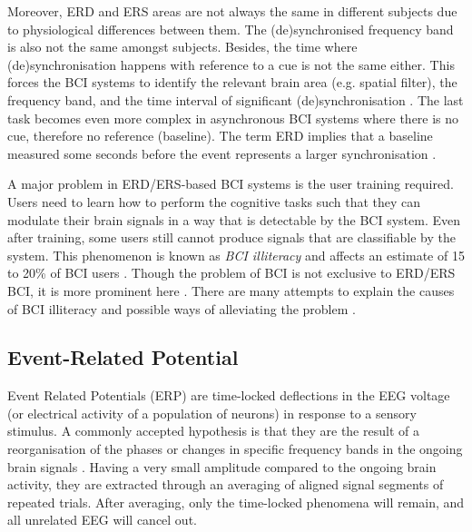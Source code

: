 Moreover, ERD and ERS areas are not always the same in different subjects due to physiological differences between them. 
The (de)synchronised frequency band is also not the same amongst subjects. 
Besides, the time where (de)synchronisation happens with reference to a cue is not the same either. 
This forces the BCI systems to identify the relevant brain area (e.g. spatial filter), the frequency band, and the time interval of significant (de)synchronisation \citep{yang_time_2014}. 
The last task becomes even more complex in asynchronous BCI systems where there is no cue, therefore no reference (baseline). 
The term ERD implies that a baseline measured some seconds before the event represents a larger synchronisation \citep{pfurtscheller_event-related_1999}.

A major problem in ERD/ERS-based BCI systems is the user training required. 
Users need to learn how to perform the cognitive tasks such that they can modulate their brain signals in a way that is detectable by the BCI system. 
Even after training, some users still cannot produce signals that are classifiable by the system. This phenomenon is known as \emph{BCI illiteracy} and affects an estimate of 15 to 20\% of BCI users \citep{allison_could_2010}. 
Though the problem of BCI is not exclusive to ERD/ERS BCI, it is more prominent here \citep{hammer_psychological_2012}.
There are many attempts to explain the causes of BCI illiteracy and possible ways of alleviating the problem \citep{allison_could_2010,hammer_psychological_2012,jeunet_why_2016}.



\subsection{Event-Related Potential}
\label{subsec:erp}

Event Related Potentials (ERP) are time-locked deflections in the EEG voltage (or electrical activity of a population of neurons) in response to a sensory stimulus. 
A commonly accepted hypothesis is that they are the result of a reorganisation of the phases or changes in specific frequency bands in the ongoing brain signals \citep{pfurtscheller_event-related_1999}.
Having a very small amplitude compared to the ongoing brain activity, they are extracted through an averaging of aligned signal segments of repeated trials. 
After averaging, only the time-locked phenomena will remain, and all unrelated EEG will cancel out. 

